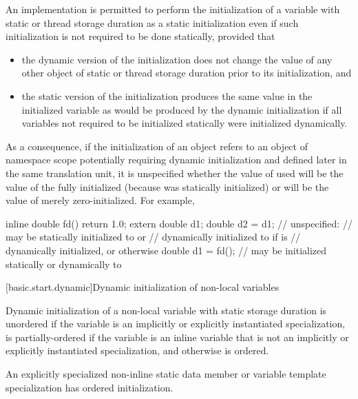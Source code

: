 \pnum
An implementation is permitted to perform the initialization of a
variable with static or thread storage duration as a static
initialization even if such initialization is not required to be done
statically, provided that
\begin{itemize}
\item
the dynamic version of the initialization does not change the
value of any other object of static or thread storage duration
prior to its initialization, and

\item
the static version of the initialization produces the same value
in the initialized variable as would be produced by the dynamic
initialization if all variables not required to be initialized statically
were initialized dynamically.
\end{itemize}
\begin{note}
As a consequence, if the initialization of an object  refers to an
object  of namespace scope potentially requiring dynamic initialization and defined
later in the same translation unit, it is unspecified whether the value of  used
will be the value of the fully initialized  (because  was statically
initialized) or will be the value of  merely zero-initialized. For example,
\begin{codeblock}
inline double fd() { return 1.0; }
extern double d1;
double d2 = d1;     // unspecified:
                    // may be statically initialized to  or
                    // dynamically initialized to  if  is
                    // dynamically initialized, or  otherwise
double d1 = fd();   // may be initialized statically or dynamically to 
\end{codeblock}
\end{note}

[basic.start.dynamic]{Dynamic initialization of non-local variables}

\pnum
{}%
%
%
Dynamic initialization of a non-local variable with static storage duration is
unordered if the variable is an implicitly or explicitly instantiated
specialization, is partially-ordered if the variable
is an inline variable that is not an implicitly or explicitly instantiated
specialization, and otherwise is ordered.
\begin{note}
An explicitly specialized non-inline static data member or
variable template specialization has ordered initialization.
\end{note}

